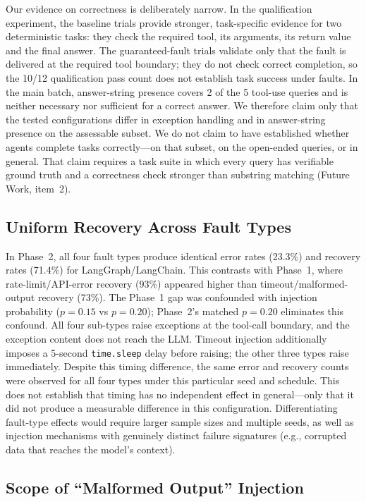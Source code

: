 \documentclass[make,article,submit,moreauthors,pdftex]{mdpi}
\newcommand{\Wrev}[1]{\texorpdfstring{{\color{RevisionOrange}#1}}{#1}}
\begin{document}
\Wrev{Our evidence on correctness is deliberately narrow. In the qualification experiment, the baseline trials provide stronger, task-specific evidence for two deterministic tasks: they check the required tool, its arguments, its return value and the final answer. The guaranteed-fault trials validate only that the fault is delivered at the required tool boundary; they do not check correct completion, so the 10/12 qualification pass count does not establish task success under faults. In the main batch, answer-string presence covers 2 of the 5 tool-use queries and is neither necessary nor sufficient for a correct answer. We therefore claim only that the tested configurations differ in exception handling and in answer-string presence on the assessable subset. We do not claim to have established whether agents complete tasks correctly---on that subset, on the open-ended queries, or in general. That claim requires a task suite in which every query has verifiable ground truth and a correctness check stronger than substring matching (Future Work, item~2).}

\subsection{Uniform Recovery Across Fault Types}

In Phase~2, all four fault types produce identical error rates (23.3\%) and recovery rates (71.4\%) for LangGraph/LangChain. This contrasts with Phase~1, where rate-limit/API-error recovery (93\%) appeared higher than timeout/malformed-output recovery (73\%). The Phase~1 gap was confounded with injection probability ($p = 0.15$ vs $p = 0.20$); Phase~2's matched $p = 0.20$ eliminates this confound. All four sub-types raise exceptions at the tool-call boundary, and the exception content does not reach the LLM. Timeout injection additionally imposes a 5-second \texttt{time.sleep} delay before raising; the other three types raise immediately. Despite this timing difference, the same error and recovery counts were observed for all four types under this particular seed and schedule. This does not establish that timing has no independent effect in general---only that it did not produce a measurable difference in this configuration. Differentiating fault-type effects would require larger sample sizes and multiple seeds, as well as injection mechanisms with genuinely distinct failure signatures (e.g., corrupted data that reaches the model's context).

\subsection{Scope of ``Malformed Output'' Injection}
\end{document}
